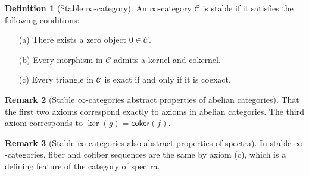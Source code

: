 \documentclass[10pt]{amsart}
\newcommand{\8}{\ensuremath{\infty}}
\newcommand{\0}{\ensuremath{\overset{\rightarrow}{0}}}
\newcommand{\1}{\ensuremath{\mathbf{1}}}
\newcommand{\C}{\ensuremath{\mathscr{C}}}
\newcommand{\coker}{\ensuremath{\mathsf{coker}}}
\theoremstyle{definition}
\newtheorem{definition}{Definition}[section]
\newtheorem{remark}[definition]{Remark}
\numberwithin{definition}{subsection}
\numberwithin{definition}{section}
\begin{document}
\begin{definition}[Stable \8-category]
  An \8-category $\C$ is stable if it satisfies the following conditions:

  \begin{enumerate}
    \item[(a)] There exists a zero object $0 \in \C$.
    \item[(b)] Every morphism in $\C$ admits a kernel and cokernel.
    \item[(c)] Every triangle in $\C$ is exact if and only if it is coexact.
  \end{enumerate}
\end{definition}

\begin{remark}[Stable \8-categories abstract properties of abelian categories]
  That the first two axioms correspond exactly to axioms in abelian categories. The third axiom corresponds to $\ker(g) = \coker(f)$.
\end{remark}

\begin{remark}[Stable \8-categories also abstract properties of spectra]
  In stable \8-categories, fiber and cofiber sequences are the same by axiom (c), which is a defining feature of the category of spectra.
\end{remark}
\end{document}
